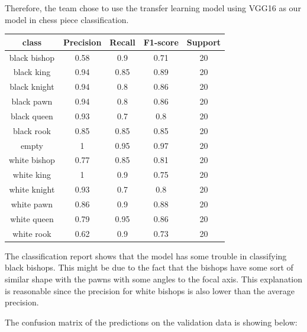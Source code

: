 \documentclass[a4paper,12pt]{article}
\begin{document}
\begin{spacing}{1.3}
Therefore, the team chose to use the transfer learning model using VGG16 as our model in chess piece classification. 

\begin{center}
	\begin{tabular}{|c|c|c|c|c|} \hline
		class & Precision & Recall & F1-score & Support \\ \hline
		black bishop & 0.58 & 0.9 & 0.71 &20 \\  \hline
		black king & 0.94 & 0.85 & 0.89 &20 \\  \hline
		black knight & 0.94 & 0.8 & 0.86 &20 \\  \hline
		black pawn & 0.94 & 0.8 & 0.86 &20 \\  \hline
		black queen& 0.93 & 0.7 & 0.8 &20 \\  \hline
		black rook& 0.85 & 0.85 & 0.85 &20 \\  \hline
		empty & 1 & 0.95 & 0.97 &20 \\  \hline
		white bishop & 0.77 & 0.85 & 0.81 &20 \\  \hline
		white king& 1 & 0.9 & 0.75 &20 \\  \hline
		white knight & 0.93 & 0.7 & 0.8 &20 \\  \hline
		white pawn & 0.86 & 0.9 & 0.88 &20 \\  \hline
		white queen& 0.79 & 0.95 & 0.86 &20 \\  \hline
		white rook& 0.62 & 0.9 & 0.73 &20 \\  \hline
	\end{tabular}
\end{center}

The classification report shows that the model has some trouble in classifying black bishops.  This might be due to the fact that the bishops have some sort of similar shape with the pawns with some angles to the focal axis. This explanation is reasonable since the precision for white bishops is also lower than the average precision.

The confusion matrix  of the predictions on the validation data is showing below:


\end{spacing}
\end{document}
